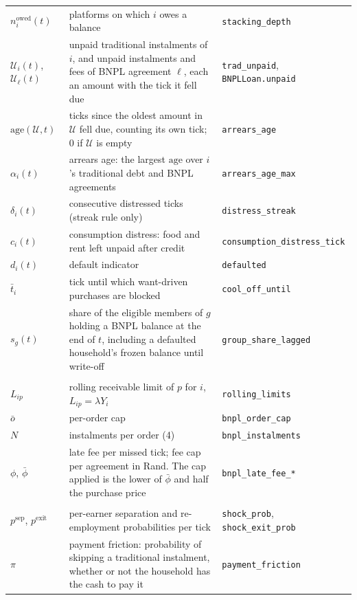 \begin{longtable}{L{2.4cm}L{7.2cm}H{3.8cm}}
$n^{\text{owed}}_i(t)$ & platforms on which $i$ owes a balance & \texttt{stacking\_depth} \\
$\mathcal{U}_i(t)$, $\mathcal{U}_\ell(t)$ & unpaid traditional instalments of $i$, and unpaid instalments and fees of \ac{BNPL} agreement $\ell$, each an amount with the tick it fell due & \texttt{trad\_unpaid}, \texttt{BNPLLoan.unpaid} \\
$\text{age}(\mathcal{U}, t)$ & ticks since the oldest amount in $\mathcal{U}$ fell due, counting its own tick; 0 if $\mathcal{U}$ is empty & \texttt{arrears\_age} \\
$\alpha_i(t)$ & arrears age: the largest $\text{age}$ over $i$'s traditional debt and \ac{BNPL} agreements & \texttt{arrears\_age\_max} \\
$\delta_i(t)$ & consecutive distressed ticks (streak rule only) & \texttt{distress\_streak} \\
$c_i(t)$ & consumption distress: food and rent left unpaid after credit & \texttt{consumption\_distress\_tick} \\
$d_i(t)$ & default indicator & \texttt{defaulted} \\
$\bar t_i$ & tick until which want-driven purchases are blocked & \texttt{cool\_off\_until} \\
$s_g(t)$ & share of the eligible members of $g$ holding a \ac{BNPL} balance at the end of $t$, including a defaulted household's frozen balance until write-off & \texttt{group\_share\_lagged} \\
\addlinespace
{} \\
$L_{ip}$ & rolling receivable limit of $p$ for $i$, $L_{ip} = \lambda Y_i$ & \texttt{rolling\_limits} \\
$\bar o$ & per-order cap & \texttt{bnpl\_order\_cap} \\
$N$ & instalments per order (4) & \texttt{bnpl\_instalments} \\
$\phi$, $\bar\phi$ & late fee per missed tick; fee cap per agreement in Rand. The cap applied is the lower of $\bar\phi$ and half the purchase price & \texttt{bnpl\_late\_fee\_*} \\
\addlinespace
{} \\
$p^{\text{sep}}$, $p^{\text{exit}}$ & per-earner separation and re-employment probabilities per tick & \texttt{shock\_prob}, \texttt{shock\_exit\_prob} \\
$\pi$ & payment friction: probability of skipping a traditional instalment, whether or not the household has the cash to pay it & \texttt{payment\_friction} \\

\end{longtable}

